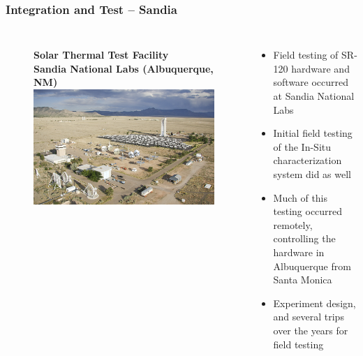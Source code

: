 \documentclass[aspectratio=169]{beamer}
\begin{document}
\begin{frame}
  \frametitle{Integration and Test -- Sandia}
  \begin{columns}[c]
    \begin{figure}
      \textbf{Solar Thermal Test Facility\\Sandia National Labs
        (Albuquerque, NM)}
      \includegraphics[width=\linewidth]{Sandia.png}
    \end{figure}

    \begin{itemize}
    \item Field testing of SR-120 hardware and software occurred at
      Sandia National Labs
    \item Initial field testing of the In-Situ characterization system
      did as well
    \item Much of this testing occurred remotely, controlling the
      hardware in Albuquerque from Santa Monica
    \item Experiment design, and several trips over the years for
      field testing
    \end{itemize}
  \end{columns}
\end{frame}
\end{document}
